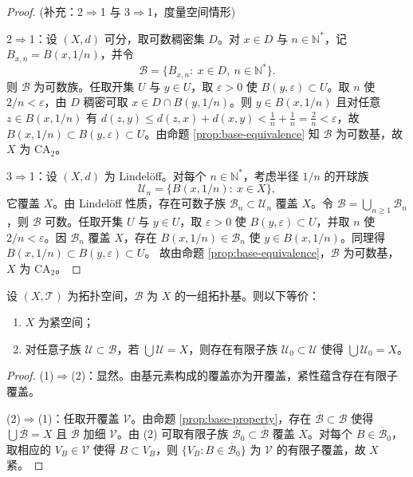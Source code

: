 \documentclass[lang=cn,a4paper,newtx,figureplace=section,tableplace=section]{elegantbook}
\begin{document}
\begin{proof}
(补充：2$\Rightarrow$1 与 3$\Rightarrow$1，度量空间情形)

2$\Rightarrow$1：设 $(X,d)$ 可分，取可数稠密集 $D$。对 $x\in D$ 与 $n\in\mathbb N^*$，记 $B_{x,n}=B(x,1/n)$，并令
\[
\mathcal B=\{B_{x,n}:\ x\in D,\ n\in\mathbb N^*\}.
\]
则 $\mathcal B$ 为可数族。任取开集 $U$ 与 $y\in U$，取 $\varepsilon>0$ 使 $B(y,\varepsilon)\subset U$。取 $n$ 使 $2/n<\varepsilon$，由 $D$ 稠密可取 $x\in D\cap B(y,1/n)$。则 $y\in B(x,1/n)$ 且对任意 $z\in B(x,1/n)$ 有 $d(z,y)\le d(z,x)+d(x,y)<\tfrac1n+\tfrac1n=\tfrac{2}{n}<\varepsilon$，故 $B(x,1/n)\subset B(y,\varepsilon)\subset U$。由命题 \ref{prop:base-equivalence} 知 $\mathcal B$ 为可数基，故 $X$ 为 $\mathrm{CA}_2$。

3$\Rightarrow$1：设 $(X,d)$ 为 Lindelöff。对每个 $n\in\mathbb N^*$，考虑半径 $1/n$ 的开球族
\[
  \mathcal U_n=\{B(x,1/n):\ x\in X\},
  \]
  它覆盖 $X$。由 Lindelöff 性质，存在可数子族 $\mathcal B_n\subset \mathcal U_n$ 覆盖 $X$。令 $\mathcal B=\bigcup_{n\ge1}\mathcal B_n$，则 $\mathcal B$ 可数。任取开集 $U$ 与 $y\in U$，取 $\varepsilon>0$ 使 $B(y,\varepsilon)\subset U$，并取 $n$ 使 $2/n<\varepsilon$。因 $\mathcal B_n$ 覆盖 $X$，存在 $B(x,1/n)\in\mathcal B_n$ 使 $y\in B(x,1/n)$。同理得 $B(x,1/n)\subset B(y,\varepsilon)\subset U$。  故由命题 \ref{prop:base-equivalence}，$\mathcal B$ 为可数基，$X$ 为 $\mathrm{CA}_2$。
\end{proof}
  \begin{proposition}[紧的基刻画]\label{prop:compact-base-characterization}
  设 $(X,\mathcal T)$ 为拓扑空间，$\mathcal B$ 为 $X$ 的一组拓扑基。则以下等价：
  \begin{enumerate}
    \item $X$ 为紧空间；
    \item 对任意子族 $\mathcal U\subset \mathcal B$，若 $\bigcup \mathcal U = X$，则存在有限子族 $\mathcal U_0\subset \mathcal U$ 使得 $\bigcup \mathcal U_0 = X$。
  \end{enumerate}
  \end{proposition}

  \begin{proof}
  (1)$\Rightarrow$(2)：显然。由基元素构成的覆盖亦为开覆盖，紧性蕴含存在有限子覆盖。

  (2)$\Rightarrow$(1)：任取开覆盖 $\mathcal V$。由命题 \ref{prop:base-property}，存在 $\overline{\mathcal B} \subset \mathcal B$ 使得 $\bigcup \overline{\mathcal B} = X$ 且 $\overline{\mathcal B}$ 加细 $\mathcal V$。由 (2) 可取有限子族 $\overline{\mathcal B}_0 \subset \overline{\mathcal B}$ 覆盖 $X$。对每个 $B\in \overline{\mathcal B}_0$，取相应的 $V_B\in \mathcal V$ 使得 $B\subset V_B$，则 $\{V_B: B\in \overline{\mathcal B}_0\}$ 为 $\mathcal V$ 的有限子覆盖，故 $X$ 紧。
  \end{proof}
 
\end{document}
